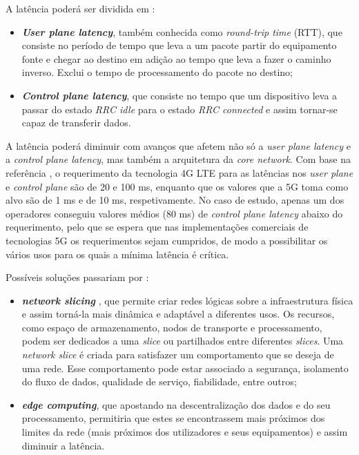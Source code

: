 \documentclass{llncs}
\begin{document}
A latência poderá ser dividida em :
\begin{itemize}
    \item \textit{\textbf{User plane latency}}, também conhecida como \textit{round-trip time} (RTT), que consiste no período de tempo que leva a um pacote partir do equipamento fonte e chegar ao destino em adição ao tempo que leva a fazer o caminho inverso. Exclui o tempo de processamento do pacote no destino;
    \item \textit{\textbf{Control plane latency}}, que consiste no tempo que um dispositivo leva a passar do estado \textit{RRC idle} para o estado \textit{RRC connected} e assim tornar-se capaz de transferir dados.
\end{itemize}

A latência poderá diminuir com avanços que afetem não só a \textit{user plane latency} e a \textit{control plane latency}, mas também a arquitetura da \textit{core network}. Com base na referência \cite{magazine}, o requerimento da tecnologia 4G LTE para as latências nos \textit{user plane} e \textit{control plane} são de 20 e 100 ms, enquanto que os valores que a 5G toma como alvo são de 1 ms e de 10 ms, respetivamente. No caso de estudo, apenas um dos operadores conseguiu valores médios (80 ms) de \textit{control plane latency} abaixo do requerimento, pelo que se espera que nas implementações comerciais de tecnologias 5G os requerimentos sejam cumpridos, de modo a possibilitar os vários usos para os quais a mínima latência é crítica.

Possíveis soluções passariam por :
\begin{itemize}
    \item \textit{\textbf{network slicing}} \cite{whitepaper}, que permite criar redes lógicas sobre a infraestrutura física e assim torná-la mais dinâmica e adaptável a diferentes usos. Os recursos, como espaço de armazenamento, nodos de transporte e processamento, podem ser dedicados a uma \textit{slice} ou partilhados entre diferentes \textit{slices}. Uma \textit{network slice} é criada para satisfazer um comportamento que se deseja de uma rede. Esse comportamento pode estar associado a segurança, isolamento do fluxo de dados, qualidade de serviço, fiabilidade, entre outros;
    \item \textit{\textbf{edge computing}}, que apostando na descentralização dos dados e do seu processamento, permitiria que estes se encontrassem mais próximos dos limites da rede (mais próximos dos utilizadores e seus equipamentos) e assim diminuir a latência.
\end{itemize}
\end{document}
